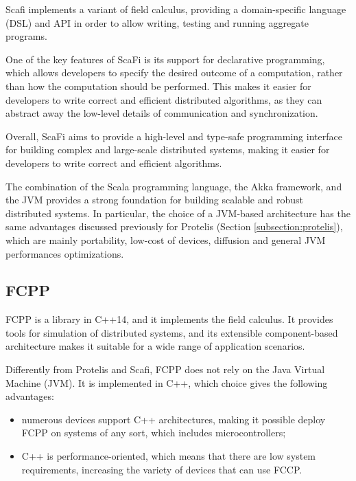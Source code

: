 Scafi implements a variant of field calculus, providing a domain-specific language (DSL) and API in order to allow writing, testing and running aggregate programs.

One of the key features of ScaFi is its support for declarative programming, which allows developers to specify the desired outcome of a computation, rather than how the computation should be performed. This makes it easier for developers to write correct and efficient distributed algorithms, as they can abstract away the low-level details of communication and synchronization.

Overall, ScaFi aims to provide a high-level and type-safe programming interface for building complex and large-scale distributed systems, making it easier for developers to write correct and efficient algorithms. 

The combination of the Scala programming language, the Akka framework, and the JVM provides a strong foundation for building scalable and robust distributed systems.\newline
In particular, the choice of a JVM-based architecture has the same advantages discussed previously for Protelis (Section \ref{subsection:protelis}), which are mainly portability, low-cost of devices, diffusion and general JVM performances optimizations.

\subsection{FCPP}\label{subsection:fcpp}
FCPP \cite{fcpp_introduction} is a library in C++14, and it implements the field calculus.\newline
It provides tools for simulation of distributed systems, and its extensible component-based architecture makes it suitable for a wide range of application scenarios.

Differently from Protelis and Scafi, FCPP does not rely on the Java Virtual Machine (JVM). It is implemented in C++, which choice gives the following advantages:
\begin{itemize}
    \item numerous devices support C++ architectures, making it possible deploy FCPP on systems of any sort, which includes microcontrollers;
    \item C++ is performance-oriented, which means that there are low system requirements, increasing the variety of devices that can use FCCP.
\end{itemize}

